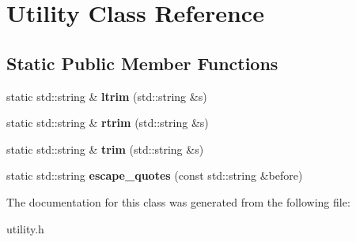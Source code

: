 \hypertarget{class_utility}{}\section{Utility Class Reference}
\label{class_utility}
\subsection*{Static Public Member Functions}
\begin{DoxyCompactItemize}
\item 
static std\+::string \& {\bfseries ltrim} (std\+::string \&s)\hypertarget{class_utility_aae38f2393afc53672ddf81cb58a3e0ec}{}\label{class_utility_aae38f2393afc53672ddf81cb58a3e0ec}

\item 
static std\+::string \& {\bfseries rtrim} (std\+::string \&s)\hypertarget{class_utility_adcde893959171d6103a32e1ff1c98525}{}\label{class_utility_adcde893959171d6103a32e1ff1c98525}

\item 
static std\+::string \& {\bfseries trim} (std\+::string \&s)\hypertarget{class_utility_ada6f197cc0efd19c8f7f7ccdbbf1c2d9}{}\label{class_utility_ada6f197cc0efd19c8f7f7ccdbbf1c2d9}

\item 
static std\+::string {\bfseries escape\+\_\+quotes} (const std\+::string \&before)\hypertarget{class_utility_aa492bd045f0324154b9be250fb04eabe}{}\label{class_utility_aa492bd045f0324154b9be250fb04eabe}

\end{DoxyCompactItemize}


The documentation for this class was generated from the following file\+:\begin{DoxyCompactItemize}
\item 
utility.\+h\end{DoxyCompactItemize}
